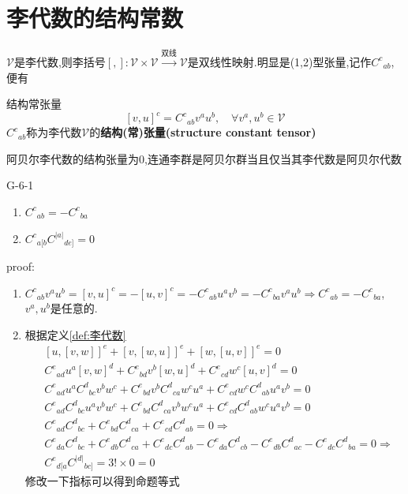 \documentclass[../main.tex]{subfiles}
\begin{document}
 \chapter{李代数的结构常数}
 $\mathscr{V}$是李代数,则李括号$[,]:\mathscr{V}\times \mathscr{V} \xrightarrow{\text{双线}} \mathscr{V}$是双线性映射.明显是(1,2)型张量,记作$C^c{}_{ab}$,便有
 \begin{definition}
   {}{结构常张量}
 $$[v,u]^c = C^c{}_{ab}v^au^b,\quad \forall v^a,u^b \in \mathscr{V}$$
 $C^c{}_{ab}$称为李代数$\mathscr{V}$的\textbf{结构(常)张量(structure constant tensor)}
 \end{definition}
 \begin{note}
 阿贝尔李代数的结构张量为0,连通李群是阿贝尔群当且仅当其李代数是阿贝尔代数
 \end{note}
\begin{theorem}{}{G-6-1}
	\begin{enumerate}
		\item $C^{c}{}_{ab}=-C^{c}{}_{ba}$
		\item $C^{c}{}_{a[b}C^{|a|}{}_{de]} = 0$
	\end{enumerate}
\end{theorem}
 proof:\begin{enumerate}
     \item $C^{c}{}_{ab}v^au^b = [v,u]^c = -[u,v]^c = -C^{c}{}_{ab}u^av^b = -C^{c}{}_{ba}v^au^b \Rightarrow C^{c}{}_{ab} = -C^{c}{}_{ba}$,$v^a,u^b$是任意的.
     \item 根据定义\ref{def:李代数}
     \begin{align*}
         &[u, [v, w]]^e + [v, [w, u]]^e + [w, [u, v]]^e = 0\\
         &C^e{}_{ad}u^a[v,w]^d + C^e{}_{bd}v^b[w,u]^d + C^e{}_{cd}w^c[u,v]^d =0\\
         &C^e{}_{ad}u^aC^d{}_{bc}v^bw^c + C^e{}_{bd}v^bC^d{}_{ca}w^cu^a + C^e{}_{cd}w^cC^d{}_{ab}u^av^b =0\\
         &C^e{}_{ad}C^d{}_{bc}u^av^bw^c + C^e{}_{bd}C^d{}_{ca}v^bw^cu^a + C^e{}_{cd}C^d{}_{ab}w^cu^av^b =0\\
         &C^e{}_{ad}C^d{}_{bc} + C^e{}_{bd}C^d{}_{ca} + C^e{}_{cd}C^d{}_{ab} =0\Rightarrow\\
         &C^e{}_{da}C^d{}_{bc} + C^e{}_{db}C^d{}_{ca} + C^e{}_{dc}C^d{}_{ab} -C^e{}_{da}C^d{}_{cb} - C^e{}_{db}C^d{}_{ac} - C^e{}_{dc}C^d{}_{ba} =0 \Rightarrow\\
         &C^e{}_{d[a}C^{|d|}{}_{bc]} = 3!\times0 = 0
     \end{align*}
     修改一下指标可以得到命题等式
 \end{enumerate}
\end{document}
